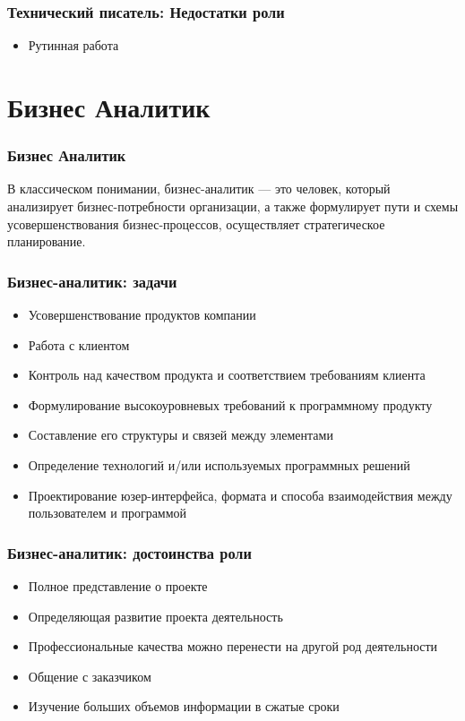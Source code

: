 \documentclass{../industrial-development}
\begin{document}
	\begin{frame} \frametitle{Технический писатель: Недостатки роли}
		\begin{block}{}
			\begin{itemize}
				\item Рутинная работа
			\end{itemize}
		\end{block}
	\end{frame}
	
	\section{Бизнес Аналитик}
	
	\begin{frame} \frametitle{Бизнес Аналитик}
		\begin{block}{}
			\alert {}В классическом понимании, {бизнес-аналитик} — это человек, который анализирует бизнес-потребности организации, а также формулирует пути и схемы усовершенствования бизнес-процессов, осуществляет стратегическое планирование. 
		\end{block}
		
	\end{frame}
	
	\begin{frame} \frametitle{Бизнес-аналитик: задачи}
		\begin{itemize}
			\item Усовершенствование продуктов компании
			\item Работа с клиентом
			\item Контроль над качеством продукта и соответствием требованиям клиента
			\item Формулирование высокоуровневых требований к программному продукту
			\item Составление его структуры и связей между элементами
			\item Определение технологий и/или используемых программных решений
			\item Проектирование юзер-интерфейса, формата и способа взаимодействия между пользователем и программой
		\end{itemize}
	\end{frame}
	
	\begin{frame} \frametitle{Бизнес-аналитик: достоинства роли}
		\begin{itemize}
			\item Полное представление о проекте
			\item Определяющая развитие проекта деятельность
			\item Профессиональные качества можно перенести на другой род  деятельности
			\item Общение с заказчиком
			\item Изучение больших объемов информации в сжатые сроки
		\end{itemize}
	\end{frame}
	
\end{document}
